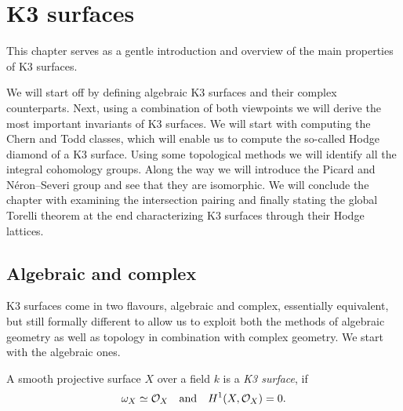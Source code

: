 \section{K3 surfaces}
\label{Chapter: K3}

This chapter serves as a gentle introduction and overview of the main properties of K3 surfaces. 

We will start off by defining algebraic K3 surfaces and their complex counterparts. Next, using a combination of both viewpoints we will derive the most important invariants of K3 surfaces.
We will start with computing the Chern and Todd classes, which will enable us to compute the so-called Hodge diamond of a K3 surface. Using some topological methods we will identify all the integral cohomology groups. Along the way we will introduce the Picard and Néron--Severi group and see that they are isomorphic. We will conclude the chapter with examining the intersection pairing and finally stating the global Torelli theorem at the end characterizing K3 surfaces through their Hodge lattices. 


\subsection{Algebraic and complex}

K3 surfaces come in two flavours, algebraic and complex, essentially equivalent, but still formally different to allow us to exploit both the methods of algebraic geometry as well as topology in combination with complex geometry. We start with the algebraic ones.

\begin{definition}
    A smooth projective surface $X$ over a field $k$ is a \emph{K3 surface}, if 
    \[
        \omega_X \simeq {\mathcal{O}_{X}} \quad \text{and} \quad H^{1}(X, {\mathcal{O}_{X}}) = 0.
    \]
\end{definition}

